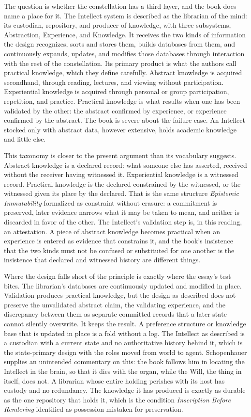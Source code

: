 \documentclass[11pt]{article}
\begin{document}
The question is whether the constellation has a third layer, and the book does name a place for it. The Intellect system is described as the librarian of the mind: its custodian, repository, and producer of knowledge, with three subsystems, Abstraction, Experience, and Knowledge. It receives the two kinds of information the design recognizes, sorts and stores them, builds databases from them, and continuously expands, updates, and modifies those databases through interaction with the rest of the constellation. Its primary product is what the authors call practical knowledge, which they define carefully. Abstract knowledge is acquired secondhand, through reading, lectures, and viewing without participation. Experiential knowledge is acquired through personal or group participation, repetition, and practice. Practical knowledge is what results when one has been validated by the other: the abstract confirmed by experience, or experience confirmed by the abstract. The book is severe about the failure case. An Intellect stocked only with abstract data, however extensive, holds academic knowledge and little else.

This taxonomy is closer to the present argument than its vocabulary suggests. Abstract knowledge is a declared record: what someone else has asserted, received without the receiver having witnessed it. Experiential knowledge is a witnessed record. Practical knowledge is the declared constrained by the witnessed, or the witnessed given its place by the declared. That is the same structure \emph{Epistemic Immutability} formalized as constraint without erasure: a commitment is preserved, later evidence narrows what it may be taken to mean, and neither is discarded in favor of the other. The Intellect's validation step is, in this reading, an attestation. A piece of abstract knowledge becomes practical when an experience is entered as evidence that constrains it, and the book's insistence that the two kinds must not be confused or substituted for one another is the insistence that declared and witnessed history are different things.

Where the design falls short of the principle is exactly where the essay's test bites. The librarian's databases are continuously updated and modified in place. Validation produces practical knowledge, but the design as described does not preserve the unvalidated abstract claim, the validating experience, and the discrepancy between them as separate committed records that a later state cannot silently overwrite. It keeps the result. A preference structure or knowledge base that is updated in place is a fold without a log. The Intellect as described is a custodian with a current state and no authoritative history behind it, which is the state-primary design with the roles moved from world to agent. Schopenhauer supplies an unintended commentary on this: the book follows him in locating the Intellect in the brain, so that it dies with the organ, while the Will, the thing in itself, does not. A librarian whose entire holding perishes with its host has custody and no redundancy. The knowledge it has produced is exactly as durable as the one repository that holds it, which is the condition \emph{Inscription Before Rendering} identified as possession mistaken for preservation.
\end{document}
